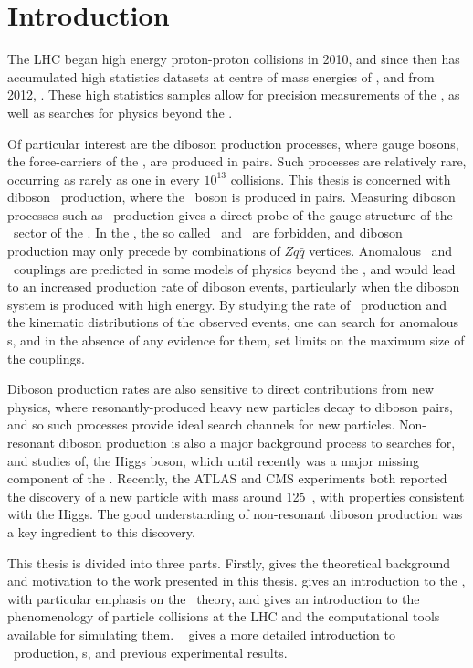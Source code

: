 \graphicspath{{Chapters/Introduction/Figures/}}

\chapter*{Introduction}
\label{chap:Introduction}

The LHC began high energy proton-proton collisions in 2010, and since then
has accumulated high statistics datasets at centre of mass energies of
, and from 2012, . These high statistics samples
allow for precision measurements of the \sm, as well as searches for
physics beyond the \sm. 

Of particular interest are the diboson production processes, where gauge bosons,
the force-carriers of the \sm, are produced in pairs. Such processes are
relatively rare, occurring as rarely as one in every $10^{13}$
collisions. This thesis is concerned with diboson \ZZ\ production, where
the \Z\ boson is produced in pairs.
Measuring diboson processes such as \ZZ\ production gives a direct probe of the gauge structure of
the \ew\ sector of the \sm. In the \sm, the so called  \ZZZ\ and \ZZg\ are forbidden, and diboson production may
only precede by combinations of $Zq\bar{q}$ vertices. Anomalous \ZZZ\ and \ZZg\ couplings are
predicted in some models of physics beyond the \sm, and would lead to an
increased production rate of diboson events, particularly when the diboson
system is produced with high energy. By studying the rate of \ZZ\ production and
the kinematic distributions of the observed events, one can search for anomalous
\TGC s, and in the absence of any evidence for them, set limits on the maximum
size of the couplings.

Diboson production rates are also sensitive to direct contributions from new
physics, where resonantly-produced heavy new particles decay to diboson pairs, and so such
processes provide ideal search channels for new particles. Non-resonant diboson
production is also a major background process to searches for, and studies of,
the Higgs boson, which until recently was a major missing component of the \sm.
Recently, the ATLAS and CMS experiments both reported the discovery of a new
particle with mass around 125~\gev, with properties consistent with the Higgs.
The good understanding of non-resonant diboson production was a key ingredient
to this discovery. 

This thesis is divided into three parts. Firstly,  gives the theoretical background
and motivation to the work presented in this thesis.  gives an
introduction to the \sm, with particular emphasis on the \ew\ theory, and gives
an introduction to the phenomenology of particle collisions at the LHC and the
computational tools available for simulating them. ~ gives a more
detailed introduction to \ZZ\ production, \TGC s, and previous experimental
results.

